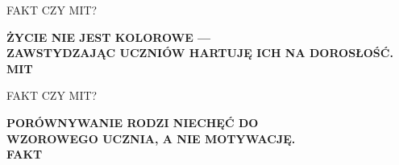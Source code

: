 \documentclass[10pt, aspectratio=169]{beamer}
\begin{document}
\begin{frame}{FAKT CZY MIT?}
    \vfill
    \begin{center}
        {\Large\sffamily\bfseries\textcolor{primaryNavy}{
        ŻYCIE NIE JEST KOLOROWE —\\
        ZAWSTYDZAJĄC UCZNIÓW HARTUJĘ ICH NA DOROSŁOŚĆ.
        }}\\[1.2cm]
        
        \pause
        {\fontsize{50}{60}\selectfont\sffamily\bfseries\textcolor{accentCoral}{MIT}}
    \end{center}
    \vfill
\end{frame}

\begin{frame}{FAKT CZY MIT?}
    \vfill
    \begin{center}
        {\Large\sffamily\bfseries\textcolor{primaryNavy}{
        PORÓWNYWANIE RODZI NIECHĘĆ DO\\
        WZOROWEGO UCZNIA, A NIE MOTYWACJĘ.
        }}\\[1.2cm]
        
        \pause
        {\fontsize{50}{60}\selectfont\sffamily\bfseries\textcolor{accentTeal}{FAKT}}
    \end{center}
    \vfill
\end{frame}
\end{document}
